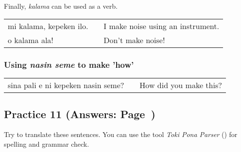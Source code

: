 Finally, \textit{kalama} can be used as a verb. \\
\begin{supertabular}{p{5,5cm}|ll}
mi kalama, kepeken ilo. && I make noise using an instrument. \\
o kalama ala! && Don't make noise! \\
\end{supertabular}  
%
\subsubsection*{Using \textit{nasin seme} to make 'how'}
%
\begin{supertabular}{p{5,5cm}|ll}
sina pali e ni kepeken nasin seme? && How did you make this? \\
\end{supertabular}  
%
%
\newpage
\subsection*{Practice 11 (Answers: Page~\pageref{'pi'})}
%
Try to translate these sentences. 
You can use the tool \textit{Toki Pona Parser} (\cite{www:rowa:02}) for spelling and grammar check. 

